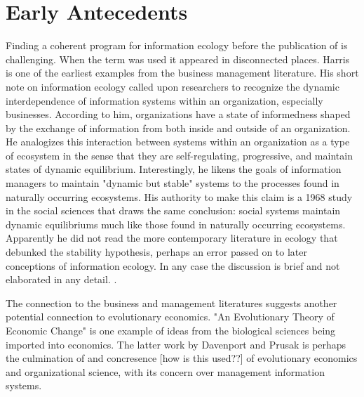 \section{Early Antecedents}

Finding a coherent program for information ecology before the publication of \cite{nardi_information_1999, davenport_information_1997} is challenging. When the term was used it appeared in disconnected places. Harris is one of the earliest examples from the business management literature. His short note on information ecology called upon researchers to recognize the dynamic interdependence of information systems within an organization, especially businesses. According to him, organizations have a state of informedness shaped by the exchange of information from both inside and outside of an organization. He analogizes this interaction between systems within an organization as a type of ecosystem in the sense that they are self-regulating, progressive, and maintain states of dynamic equilibrium. Interestingly, he likens the goals of information managers to maintain "dynamic but stable" systems to the processes found in naturally occurring ecosystems. His authority to make this claim is a 1968 study in the social sciences that draws the same conclusion: social systems maintain dynamic equilibriums much like those found in naturally occurring ecosystems. Apparently he did not read the more contemporary literature in ecology that debunked the stability hypothesis, perhaps an error passed on to later conceptions of information ecology. In any case the discussion is brief and not elaborated in any detail. \cite{harris_information_1989}.

The connection to the business and management literatures suggests another potential connection to evolutionary economics. "An Evolutionary Theory of Economic Change" \cite{nelson_evolutionary_1985} is one example of ideas from the biological sciences being imported into economics. The latter work by Davenport and Prusak is perhaps the culmination of and concresence [how is this used??] of evolutionary economics and organizational science, with its concern over management information systems.

